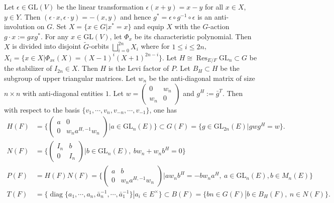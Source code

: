 \documentclass{amsart}
\theoremstyle{definition}
\theoremstyle{remark}
\newcommand{\1}{\mathbf{1}}
\newcommand{\GL}{\mathrm{GL}}
\DeclareMathOperator{\diag}{diag}
\DeclareMathOperator{\Res}{Res}
\theoremstyle{definition}
\newcommand{\wt}{\widetilde}
\begin{document}
Let $\epsilon\in \GL(V)$ be the linear transformation 
$\epsilon(x+y)=x-y$ for all $x\in X$, $y\in Y$. Then $(\epsilon\cdot x, \epsilon \cdot y)=-(x,y)$ and hence $g^*= \epsilon\circ g^{-1}\circ \epsilon$
is an anti-involution on $G$.  Set  $X=\{x\in G| x^*=x\}$ 
and equip $X$ with the $G$-action
$g\cdot x:=g x g^*$.  For any $x\in\GL(V)$, let $\Phi_x$ be  its characteristic polynomial. Then $X$ is divided into disjoint $\wt{G}$-orbits $\bigsqcup_{i=0}^{2n}X_i$ where for $1\leq i\leq 2n$, $X_i=\{x\in X| \Phi_{x\epsilon}(X)=(X-1)^i(X+1)^{2n-i}\}$. Let $H\cong \Res_{E/F}\GL_{n}\subset G$ be the stabilizer of $I_{2n}\in X$. Then $H$ is 
the Levi factor of $P$.  Let $B_H\subset H$ be the subgroup of upper triangular matrices. Let $w_n$ be the anti-diagonal matrix of size $n\times n$ with anti-diagonal entities $1$. Let $ w=\begin{pmatrix} 0 & w_n \\ w_n & 0\end{pmatrix}$  and $g^H:=\bar{g}^{T}$. Then  with respect to the basis $\{v_1,\cdots, v_n, v_{-n},\cdots, v_{-1}\}$, one has 
\begin{align*}
H(F)&=\{\begin{pmatrix} a & 0 \\ 0 & w_na^{H,-1}w_n\end{pmatrix}| a\in \GL_n(E)\}\subset G(F)=\{g\in \GL_{2n}(E)| g w g^H=w\}.\\
N(F)&=\{\begin{pmatrix} I_n & b \\ 0 & I_n\end{pmatrix}| b\in\GL_n(E),\ bw_n+w_nb^H=0\}\\
P(F)&=H(F)N(F)=\{\begin{pmatrix}a & b \\ 0 & w_n a^{H,-1}w_n\end{pmatrix}|aw_nb^H=-bw_na^H,\ a\in \GL_n(E), b\in M_n(E)\}\\
T(F)&=\{\diag\{a_1,\cdots, a_n, \bar{a}_n^{-1},\cdots,\bar{a}_1^{-1}\}| a_i\in E^\times\}\subset B(F)=\{bn\in G(F)| b\in B_H(F),\ n\in N(F)\}.
\end{align*}
\end{document}
